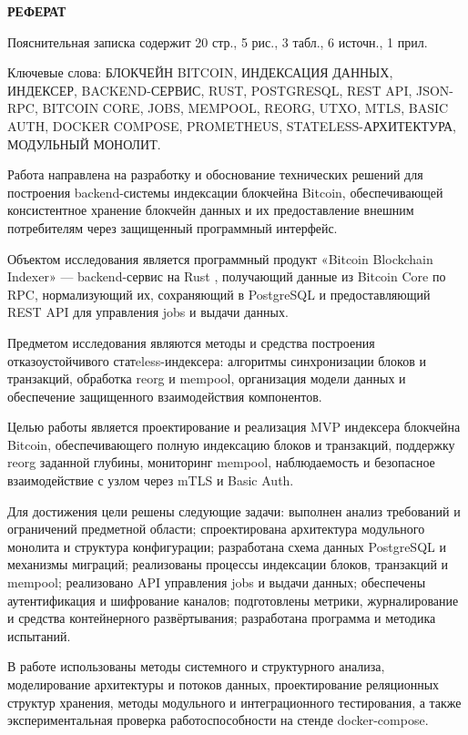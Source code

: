 ﻿\documentclass[14pt,a4paper]{extarticle}
\begin{document}
\newpage

\begin{center}
\textbf{РЕФЕРАТ}
\end{center}

\noindent Пояснительная записка содержит 20 стр., 5 рис., 3 табл., 6 источн., 1 прил.

\noindent Ключевые слова: БЛОКЧЕЙН BITCOIN, ИНДЕКСАЦИЯ ДАННЫХ, ИНДЕКСЕР, BACKEND-СЕРВИС, RUST, POSTGRESQL, REST API, JSON-RPC, BITCOIN CORE, JOBS, MEMPOOL, REORG, UTXO, MTLS, BASIC AUTH, DOCKER COMPOSE, PROMETHEUS, STATELESS-АРХИТЕКТУРА, МОДУЛЬНЫЙ МОНОЛИТ.

\noindent Работа направлена на разработку и обоснование технических решений для построения backend-системы индексации блокчейна Bitcoin, обеспечивающей консистентное хранение блокчейн данных и их предоставление внешним потребителям через защищенный программный интерфейс.

\noindent Объектом исследования является программный продукт «Bitcoin Blockchain Indexer» — backend-сервис на Rust \cite{src_rust}, получающий данные из Bitcoin Core по RPC, нормализующий их, сохраняющий в PostgreSQL \cite{src_postgres} и предоставляющий REST API для управления jobs и выдачи данных.

\noindent Предметом исследования являются методы и средства построения отказоустойчивого статeless-индексера: алгоритмы синхронизации блоков и транзакций, обработка reorg и mempool, организация модели данных и обеспечение защищенного взаимодействия компонентов.

\noindent Целью работы является проектирование и реализация MVP индексера блокчейна Bitcoin, обеспечивающего полную индексацию блоков и транзакций, поддержку reorg заданной глубины, мониторинг mempool, наблюдаемость и безопасное взаимодействие с узлом через mTLS и Basic Auth.

\noindent Для достижения цели решены следующие задачи: выполнен анализ требований и ограничений предметной области; спроектирована архитектура модульного монолита и структура конфигурации; разработана схема данных PostgreSQL и механизмы миграций; реализованы процессы индексации блоков, транзакций и mempool; реализовано API управления jobs и выдачи данных; обеспечены аутентификация и шифрование каналов; подготовлены метрики, журналирование и средства контейнерного развёртывания; разработана программа и методика испытаний.

\noindent В работе использованы методы системного и структурного анализа, моделирование архитектуры и потоков данных, проектирование реляционных структур хранения, методы модульного и интеграционного тестирования, а также экспериментальная проверка работоспособности на стенде docker-compose.
\end{document}
